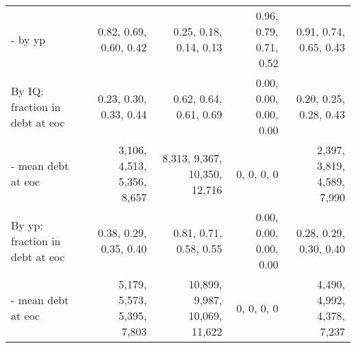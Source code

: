 \begin{tabular}{lrrrr}
- by yp & 0.82, 0.69, 0.60, 0.42  & 0.25, 0.18, 0.14, 0.13  & 0.96, 0.79, 0.71, 0.52  & 0.91, 0.74, 0.65, 0.43  \\
By IQ: fraction in debt at eoc & 0.23, 0.30, 0.33, 0.44  & 0.62, 0.64, 0.61, 0.69  & 0.00, 0.00, 0.00, 0.00  & 0.20, 0.25, 0.28, 0.43  \\
- mean debt at eoc & 3,106, 4,513, 5,356, 8,657  & 8,313, 9,367, 10,350, 12,716  & 0, 0, 0, 0  & 2,397, 3,819, 4,589, 7,990  \\
By yp: fraction in debt at eoc & 0.38, 0.29, 0.35, 0.40  & 0.81, 0.71, 0.58, 0.55  & 0.00, 0.00, 0.00, 0.00  & 0.28, 0.29, 0.30, 0.40  \\
- mean debt at eoc & 5,179, 5,573, 5,395, 7,803  & 10,899, 9,987, 10,069, 11,622  & 0, 0, 0, 0  & 4,490, 4,992, 4,378, 7,237  \\
\hline
\end{tabular}%
